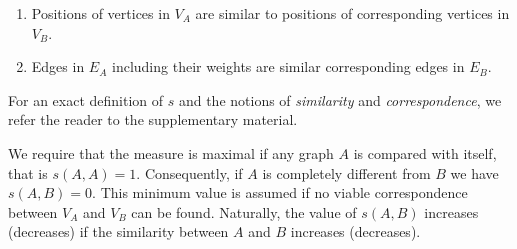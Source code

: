 		\begin{enumerate}
		\item Positions of vertices in $V_A$ are similar to positions of corresponding vertices in $V_B$.  
		\item Edges in $E_A$ including their weights are similar corresponding edges in $E_B$. 
		\end{enumerate}

		For an exact definition of $s$ and the notions of \emph{similarity} and \emph{correspondence}, we refer the reader to the supplementary material. 


		We require that the measure is maximal if any graph $A$ is compared with itself, that is $s(A,A) = 1$. Consequently, if $A$ is completely different from $B$ we have $s(A,B) = 0$. This minimum value is assumed if no viable correspondence between $V_A$ and $V_B$ can be found. Naturally, the value of $s(A,B)$ increases (decreases) if the similarity between $A$ and $B$ increases (decreases). 








